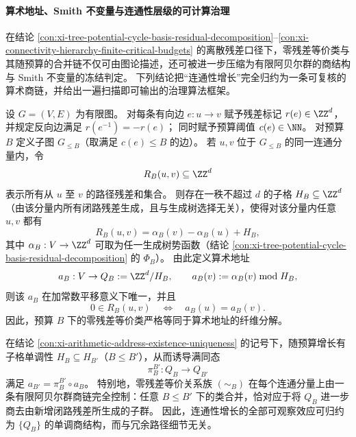 
\paragraph{算术地址、Smith 不变量与连通性层级的可计算治理}
在结论 \ref{con:xi-tree-potential-cycle-basis-residual-decomposition}--\ref{con:xi-connectivity-hierarchy-finite-critical-budgets} 的离散残差口径下，零残差等价类与其随预算的合并链不仅可由图论描述，还可被进一步压缩为有限阿贝尔群的商结构与 Smith 不变量的冻结判定。
下列结论把“连通性增长”完全归约为一条可复核的算术商链，并给出一遍扫描即可输出的治理算法框架。

\begin{conclusion}[零残差可达关系的整格余类刻画与算术地址的存在唯一性]\label{con:xi-arithmetic-address-existence-uniqueness}
设 \(G=(V,E)\) 为有限图。
对每条有向边 \(e:u\to v\) 赋予残差标记 \(r(e)\in\ZZ^d\)，并规定反向边满足 \(r(e^{-1})=-r(e)\)；
同时赋予预算阈值 \(c(e)\in\NN\)。
对预算 \(B\) 定义子图 \(G_{\le B}\)（取满足 \(c(e)\le B\) 的边）。
若 \(u,v\) 位于 \(G_{\le B}\) 的同一连通分量内，令
\[
R_B(u,v)\subseteq\ZZ^d
\]
表示所有从 \(u\) 至 \(v\) 的路径残差和集合。
则存在一秩不超过 \(d\) 的子格 \(H_B\subseteq\ZZ^d\)（由该分量内所有闭路残差生成，且与生成树选择无关），使得对该分量内任意 \(u,v\) 都有
\[
R_B(u,v)=\alpha_B(v)-\alpha_B(u)+H_B,
\]
其中 \(\alpha_B:V\to\ZZ^d\) 可取为任一生成树势函数（结论 \ref{con:xi-tree-potential-cycle-basis-residual-decomposition} 的 \(\Phi_B\)）。
由此定义算术地址
\[
a_B:V\to Q_B:=\ZZ^d/H_B,
\qquad
a_B(v):=\alpha_B(v)\bmod H_B,
\]
则该 \(a_B\) 在加常数平移意义下唯一，并且
\[
0\in R_B(u,v)\quad\Longleftrightarrow\quad a_B(u)=a_B(v).
\]
因此，预算 \(B\) 下的零残差等价类严格等同于算术地址的纤维分解。
\end{conclusion}

\begin{conclusion}\label{con:xi-arithmetic-address-functorial-quotient-chain}
在结论 \ref{con:xi-arithmetic-address-existence-uniqueness} 的记号下，随预算增长有子格单调性 \(H_B\subseteq H_{B'}\)（\(B\le B'\)），从而诱导满同态
\[
\pi_{B}^{B'}:Q_B\to Q_{B'}
\]
满足 \(a_{B'}=\pi_{B}^{B'}\circ a_B\)。
特别地，零残差等价关系族 \((\sim_B)\) 在每个连通分量上由一条有限阿贝尔群商链完全控制：任意 \(B\le B'\) 下的类合并，恰对应于将 \(Q_B\) 进一步商去由新增闭路残差所生成的子群。
因此，连通性增长的全部可观察效应可归约为 \(\{Q_B\}\) 的单调商结构，而与冗余路径细节无关。
\end{conclusion}

